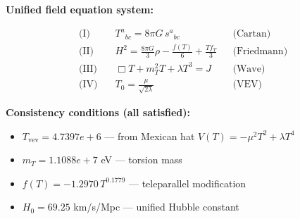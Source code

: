 
\textbf{Unified field equation system:}

\begin{align}
  \text{(I)} \quad & T^a{}_{bc} = 8\pi G \, s^a{}_{bc} && \text{(Cartan)} \\
  \text{(II)} \quad & H^2 = \frac{8\pi G}{3}\rho - \frac{f(T)}{6} + \frac{Tf_T}{3} && \text{(Friedmann)} \\
  \text{(III)} \quad & \Box T + m_T^2 T + \lambda T^3 = J && \text{(Wave)} \\
  \text{(IV)} \quad & T_0 = \frac{\mu}{\sqrt{2\lambda}} && \text{(VEV)}
\end{align}

\textbf{Consistency conditions (all satisfied):}
\begin{itemize}
  \item $T_{\text{vev}} = 4.7397e+6$ — from Mexican hat $V(T) = -\mu^2 T^2 + \lambda T^4$
  \item $m_T = 1.1088e+7$ eV — torsion mass
  \item $f(T) = -1.2970 \, T^{0.1779}$ — teleparallel modification
  \item $H_0 = 69.25$ km/s/Mpc — unified Hubble constant
\end{itemize}